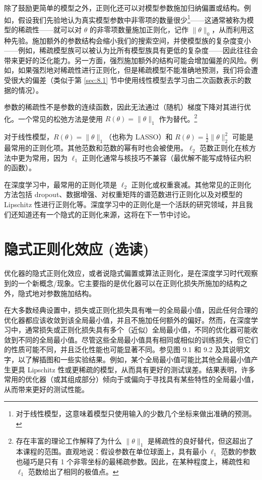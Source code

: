 除了鼓励更简单的模型之外，正则化还可以对模型参数施加归纳偏置或结构。例如，假设我们先验地认为真实模型参数中非零项的数量很少\footnote{对于线性模型，这意味着模型只使用输入的少数几个坐标来做出准确的预测。}——这通常被称为模型的稀疏性——就可以对 $\theta$ 的非零项数量施加正则化，记作 $\|\theta\|_0$，从而利用这种先验。施加额外的参数结构会缩小我们的搜索空间，并使模型族的复杂度变小——例如，稀疏模型族可以被认为比所有模型族具有更低的复杂度——因此往往会带来更好的泛化能力。另一方面，强烈施加额外的结构可能会增加偏差的风险。例如，如果强烈地对稀疏性进行正则化，但是稀疏模型不能准确地预测，我们将会遭受很大的偏差（类似于第 \ref{sec:8.1} 节中使用线性模型去学习由二次函数表示的数据的情况）。

参数的稀疏性不是参数的连续函数，因此无法通过（随机）梯度下降对其进行优化。一个常见的松弛方法是使用 $R(\theta) = \|\theta\|_1$ 作为替代。\footnote{存在丰富的理论工作解释了为什么 $\|\theta\|_1$ 是稀疏性的良好替代，但这超出了本课程的范围。直观地说：假设参数在单位球面上，具有最小 $\ell_1$ 范数的参数也碰巧是只有 1 个非零坐标的最稀疏参数。因此，在某种程度上，稀疏性和 $\ell_1$ 范数给出了相同的极值点。}

对于线性模型，$R(\theta) = \|\theta\|_1$（也称为 LASSO）和 $R(\theta) = \frac{1}{2}\|\theta\|_2^2$ 可能是最常用的正则化项。其他范数和范数的幂有时也会被使用。$\ell_2$ 范数正则化在核方法中更为常用，因为 $\ell_1$ 正则化通常与核技巧不兼容（最优解不能写成特征内积的函数）。

在深度学习中，最常用的正则化项是 $\ell_2$ 正则化或权重衰减。其他常见的正则化方法包括 dropout、数据增强、对权重矩阵的谱范数进行正则化以及对模型的 Lipschitz 性进行正则化等。深度学习中的正则化是一个活跃的研究领域，并且我们还知道还有一个隐式的正则化来源，这将在下一节中讨论。

\section{隐式正则化效应 (选读)}\label{sec:9.2}

优化器的隐式正则化效应，或者说隐式偏置或算法正则化，是在深度学习时代观察到的一个新概念/现象。它主要指的是优化器可以在正则化损失所施加的结构之外，隐式地对参数施加结构。

在大多数经典设置中，损失或正则化损失具有唯一的全局最小值，因此任何合理的优化器都应该收敛到该全局最小值，并且不施加任何额外的偏好。然而，在深度学习中，通常损失或正则化损失具有多个（近似）全局最小值，不同的优化器可能收敛到不同的全局最小值。尽管这些全局最小值具有相同或相似的训练损失，但它们的性质可能不同，并且泛化性能也可能显著不同。参见图 9.1 和 9.2 及其说明文字，以了解插图和一些实验结果。例如，某个全局最小值可能比其他全局最小值产生更具 Lipschitz 性或更稀疏的模型，从而具有更好的测试误差。结果表明，许多常用的优化器（或其组成部分）倾向于或偏向于寻找具有某些特性的全局最小值，从而带来更好的测试性能。

